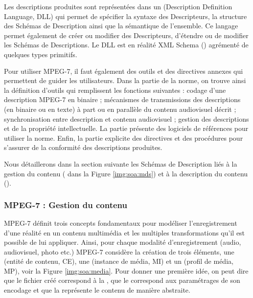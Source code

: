 Les descriptions produites sont représentées dans un  (Description Definition Language, DLL) qui permet de spécifier la syntaxe des Descripteurs, la structure des Schémas de Description ainsi que la sémantique de l'ensemble.
Ce langage permet également de créer ou modifier des Descripteurs, d'étendre ou de modifier les Schémas de Descriptions. 
Le DLL est en réalité XML Schema (\cite{Fallside2004}) agrémenté de quelques types primitifs.

Pour utiliser MPEG-7, il faut également des outils et des directives annexes qui permettent de guider les utilisateurs. 
Dans la partie  de la norme, on trouve ainsi la définition d'outils qui remplissent les fonctions suivantes : codage d'une description MPEG-7 en binaire ; mécanismes de transmissions des descriptions (en binaire ou en texte) à part ou en parallèle du contenu audiovisuel décrit ;  synchronisation entre description et contenu audiovisuel ; gestion des descriptions et de la propriété intellectuelle. 
La partie  présente des logiciels de références pour utiliser la norme.
Enfin, la partie  explicite des directives et des procédures pour s'assurer de la conformité des descriptions produites.

Nous détaillerons dans la section suivante les Schémas de Description liés à la gestion du contenu ( dans la Figure \ref{img:soa:mds}) et à la description du contenu ().\\


\subsubsection{MPEG-7 : Gestion du contenu}\label{sec:mpeg7-gc}
MPEG-7 définit trois concepts fondamentaux pour modéliser l'enregistrement d'une réalité en un contenu multimédia et les multiples transformations qu'il est possible de lui appliquer. 
Ainsi, pour chaque modalité d'enregistrement (audio, audiovisuel, photo etc.) MPEG-7 considère la création de trois éléments, une  (entité de contenu, CE), une  (instance de média, MI) et un  (profil de média, MP), voir la Figure \ref{img:soa:media}.
Pour donner une première idée, on peut dire que le fichier créé correspond à la , que le  correspond aux paramétrages de son encodage et que la  représente le contenu de manière abstraite.

